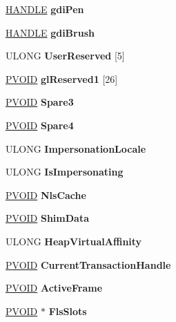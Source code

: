 \begin{DoxyCompactItemize}
\hyperlink{interfacevoid}{H\+A\+N\+D\+LE} {\bfseries gdi\+Pen}
\item 
\mbox{\label{struct___t_e_b_aa300131e3adf479f89d72057bd7deb73}} 
\hyperlink{interfacevoid}{H\+A\+N\+D\+LE} {\bfseries gdi\+Brush}
\item 
\mbox{\label{struct___t_e_b_aca04d9202b8ba00ae76c9cb913af87e5}} 
U\+L\+O\+NG {\bfseries User\+Reserved} \mbox{[}5\mbox{]}
\item 
\mbox{\label{struct___t_e_b_ab6346176b02efcb8efa85c41a0770c52}} 
\hyperlink{interfacevoid}{P\+V\+O\+ID} {\bfseries gl\+Reserved1} \mbox{[}26\mbox{]}
\item 
\mbox{\label{struct___t_e_b_a574d46554686f2f4f149cec96eea9d92}} 
\hyperlink{interfacevoid}{P\+V\+O\+ID} {\bfseries Spare3}
\item 
\mbox{\label{struct___t_e_b_a71dd91b6259d7b0ecdda5cb50569656d}} 
\hyperlink{interfacevoid}{P\+V\+O\+ID} {\bfseries Spare4}
\item 
\mbox{\label{struct___t_e_b_afb99c2d4cd86e36cce651af156e42924}} 
U\+L\+O\+NG {\bfseries Impersonation\+Locale}
\item 
\mbox{\label{struct___t_e_b_a200dd843229f4934d4ddf3a0a644ebf4}} 
U\+L\+O\+NG {\bfseries Is\+Impersonating}
\item 
\mbox{\label{struct___t_e_b_af9fbe5b136410415421546e8342b9e89}} 
\hyperlink{interfacevoid}{P\+V\+O\+ID} {\bfseries Nls\+Cache}
\item 
\mbox{\label{struct___t_e_b_adfbef3c8174e481b7e595bb07242b72a}} 
\hyperlink{interfacevoid}{P\+V\+O\+ID} {\bfseries Shim\+Data}
\item 
\mbox{\label{struct___t_e_b_a487a6ec148a9c11aacaeeb18211336d9}} 
U\+L\+O\+NG {\bfseries Heap\+Virtual\+Affinity}
\item 
\mbox{\label{struct___t_e_b_ab891c7f5d8a5d3ec9da18e88c30bd471}} 
\hyperlink{interfacevoid}{P\+V\+O\+ID} {\bfseries Current\+Transaction\+Handle}
\item 
\mbox{\label{struct___t_e_b_a828de3a81860dec9a18995b7f7e1cc23}} 
\hyperlink{interfacevoid}{P\+V\+O\+ID} {\bfseries Active\+Frame}
\item 
\mbox{\label{struct___t_e_b_a5a48d0b42dec54b9aca2592e84695083}} 
\hyperlink{interfacevoid}{P\+V\+O\+ID} $\ast$ {\bfseries Fls\+Slots}
\end{DoxyCompactItemize}


